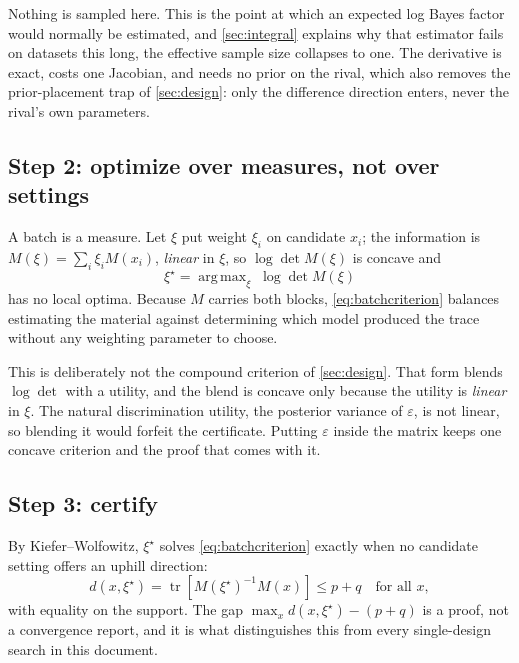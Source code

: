 \documentclass[10pt]{article}
\DeclareMathOperator*{\argmax}{arg\,max}
\begin{document}
Nothing is sampled here. This is the point at which an expected log Bayes factor would
normally be estimated, and \cref{sec:integral} explains why that estimator fails on datasets
this long, the effective sample size collapses to one. The derivative is exact, costs one
Jacobian, and needs no prior on the rival, which also removes the prior-placement trap of
\cref{sec:design}: only the difference direction enters, never the rival's own parameters.

\subsection*{Step 2: optimize over measures, not over settings}

A batch is a measure. Let $\xi$ put weight $\xi_i$ on candidate $x_i$; the information is
$M(\xi) = \sum_i \xi_i M(x_i)$, \emph{linear} in $\xi$, so $\log\det M(\xi)$ is concave and
%
\begin{equation}
\xi^\star = \argmax_{\xi} \; \log\det M(\xi)
\label{eq:batchcriterion}
\end{equation}
%
has no local optima. Because $M$ carries both blocks, \eqref{eq:batchcriterion} balances
estimating the material against determining which model produced the trace without any
weighting parameter to choose.

This is deliberately not the compound criterion of \cref{sec:design}. That form blends
$\log\det$ with a utility, and the blend is concave only because the utility is \emph{linear}
in $\xi$. The natural discrimination utility, the posterior variance of $\varepsilon$, is
not linear, so blending it would forfeit the certificate. Putting $\varepsilon$ inside the
matrix keeps one concave criterion and the proof that comes with it.

\subsection*{Step 3: certify}

By Kiefer--Wolfowitz, $\xi^\star$ solves \eqref{eq:batchcriterion} exactly when no candidate
setting offers an uphill direction:
%
\begin{equation}
d(x,\xi^\star) = \operatorname{tr}\!\left[M(\xi^\star)^{-1} M(x)\right] \le p + q
\quad\text{for all } x,
\end{equation}
%
with equality on the support. The gap $\max_x d(x,\xi^\star) - (p+q)$ is a proof, not a
convergence report, and it is what distinguishes this from every single-design search in this
document.
\end{document}
